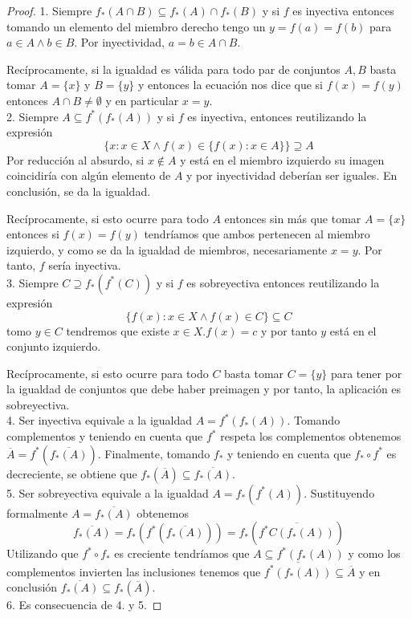 \begin{proof}
	1. Siempre $f_*(A \cap B) \subseteq f_*(A) \cap f_*(B)$ y si $f$ es inyectiva entonces tomando un elemento del miembro derecho tengo un $y = f(a) = f(b)$ para $a \in A \land b \in B$. Por inyectividad, $a = b \in A \cap B$. 
	
	Recíprocamente, si la igualdad es válida para todo par de conjuntos $A,B$ basta tomar $A = \{x\}$ y $B = \{y\}$ y entonces la ecuación nos dice que si $f(x) = f(y)$ entonces $A \cap B \neq \emptyset$ y en particular $x = y$. \\
	2. Siempre $A \subseteq f^*(f_*(A))$  y si $f$ es inyectiva, entonces reutilizando la expresión $$\{x:x \in X \land f(x) \in \{f(x):x \in A\} \} \supseteq A$$ Por reducción al absurdo, si $x \notin A$ y está en el miembro izquierdo su imagen coincidiría con algún elemento de $A$ y por inyectividad deberían ser iguales. En conclusión, se da la igualdad. 
	
	Recíprocamente, si esto ocurre para todo $A$ entonces sin más que tomar $A = \{x\}$ entonces si $f(x) = f(y)$ tendríamos que ambos pertenecen al miembro izquierdo, y como se da la igualdad de miembros, necesariamente $x = y$. Por tanto, $f$ sería inyectiva.  \\
	3. Siempre $ C \supseteq f_*(f^*(C))$ y si $f$ es sobreyectiva entonces reutilizando la expresión $$\{f(x):x \in X \land f(x) \in C \} \subseteq C $$ tomo $y \in C$ tendremos que existe $x \in X. f(x) = c$ y por tanto $y$ está en el conjunto izquierdo. 
	
	Recíprocamente, si esto ocurre para todo $C$ basta tomar $C = \{y\}$ para tener por la igualdad de conjuntos que debe haber preimagen y por tanto, la aplicación es sobreyectiva. \\
	4. Ser inyectiva equivale a la igualdad $A = f^*(f_*(A))$. Tomando complementos y teniendo en cuenta que $f^*$ respeta los complementos obtenemos $\overline{A} = f^*(\overline{f_*(A)})$. Finalmente, tomando $f_*$ y teniendo en cuenta que $f_* \circ f^*$ es decreciente, se obtiene que $f_*(\overline{A}) \subseteq \overline{f_*(A)}$.\\
	5. Ser sobreyectiva equivale a la igualdad $A = f_*(f^*(A))$. Sustituyendo formalmente $A = \overline{f_*(A)}$ obtenemos $$\overline{f_*(A)} = f_*(f^*(\overline{f_*(A)})) = f_*(\overline{f^*C(f_*(A))})$$ Utilizando que $f^* \circ f_*$ es creciente tendríamos que $A \subseteq f^*(f_*(A))$ y como los complementos invierten las inclusiones tenemos que $\overline{f^*(f_*(A))} \subseteq \overline{A}$ y en conclusión $\overline{f_*(A)} \subseteq f_*(\overline{A})$.\\
	6. Es consecuencia de 4. y 5. 
\end{proof}

